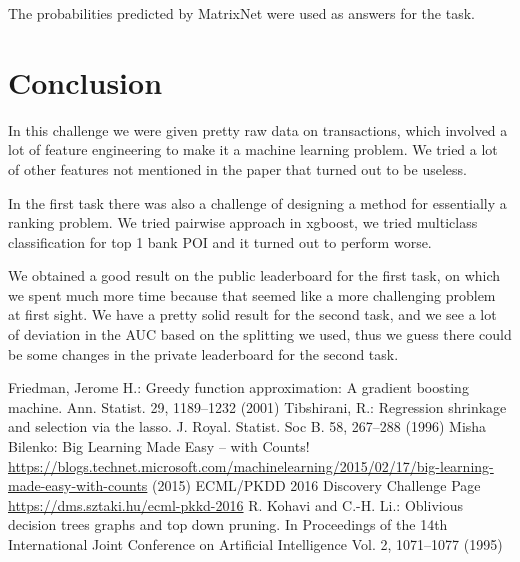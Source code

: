 \documentclass{llncs}
\begin{document}
    The probabilities predicted by MatrixNet were used as answers for the task.
    
	\section{Conclusion}
	
	In this challenge we were given pretty raw data on transactions, which involved a lot of feature engineering to make it a machine learning problem. We tried a lot of other features not mentioned in the paper that turned out to be useless.
	
	In the first task there was also a challenge of designing a method for essentially a ranking problem. We tried pairwise approach in xgboost, we tried multiclass classification for top 1 bank POI and it turned out to perform worse.
	
	We obtained a good result on the public leaderboard for the first task, on which we spent much more time because that seemed like a more challenging problem at first sight. We have a pretty solid result for the second task, and we see a lot of deviation in the AUC based on the splitting we used, thus we guess there could be some changes in the private leaderboard for the second task.
	
	\begin{thebibliography}{1}		
	Friedman, Jerome H.:
	Greedy function approximation: A gradient boosting machine.
	Ann. Statist. 29, 1189--1232 (2001)
	Tibshirani, R.:
	Regression shrinkage and selection via the lasso.
	J. Royal. Statist. Soc B. 58, 267--288 (1996)
	Misha Bilenko:
	Big Learning Made Easy – with Counts!
	\url{https://blogs.technet.microsoft.com/machinelearning/2015/02/17/big-learning-made-easy-with-counts} (2015)
	ECML/PKDD 2016 Discovery Challenge Page
	\url{https://dms.sztaki.hu/ecml-pkkd-2016}
	R. Kohavi and C.-H. Li.:
	Oblivious decision trees graphs and top down pruning. 
	In Proceedings of the 14th International Joint Conference on Artificial Intelligence Vol. 2, 1071--1077 (1995)
	\end{thebibliography}
	
\end{document}
